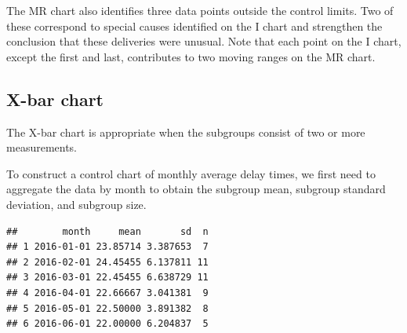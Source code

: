 \documentclass[
]{book}
\newenvironment{Shaded}{\begin{snugshade}}{\end{snugshade}}
\newcommand{\AttributeTok}[1]{\textcolor[rgb]{0.13,0.29,0.53}{#1}}
\newcommand{\CommentTok}[1]{\textcolor[rgb]{0.56,0.35,0.01}{\textit{#1}}}
\newcommand{\ConstantTok}[1]{\textcolor[rgb]{0.56,0.35,0.01}{#1}}
\newcommand{\ControlFlowTok}[1]{\textcolor[rgb]{0.13,0.29,0.53}{\textbf{#1}}}
\newcommand{\DecValTok}[1]{\textcolor[rgb]{0.00,0.00,0.81}{#1}}
\newcommand{\FunctionTok}[1]{\textcolor[rgb]{0.13,0.29,0.53}{\textbf{#1}}}
\newcommand{\NormalTok}[1]{#1}
\newcommand{\OtherTok}[1]{\textcolor[rgb]{0.56,0.35,0.01}{#1}}
\newcommand{\SpecialCharTok}[1]{\textcolor[rgb]{0.81,0.36,0.00}{\textbf{#1}}}
\begin{document}
The MR chart also identifies three data points outside the control limits. Two of these correspond to special causes identified on the I chart and strengthen the conclusion that these deliveries were unusual. Note that each point on the I chart, except the first and last, contributes to two moving ranges on the MR chart.

\subsection{X-bar chart}\label{x-bar-chart}

The X-bar chart is appropriate when the subgroups consist of two or more measurements.

To construct a control chart of monthly average delay times, we first need to aggregate the data by month to obtain the subgroup mean, subgroup standard deviation, and subgroup size.

\begin{Shaded}
\end{Shaded}

\begin{verbatim}
##        month     mean       sd  n
## 1 2016-01-01 23.85714 3.387653  7
## 2 2016-02-01 24.45455 6.137811 11
## 3 2016-03-01 22.45455 6.638729 11
## 4 2016-04-01 22.66667 3.041381  9
## 5 2016-05-01 22.50000 3.891382  8
## 6 2016-06-01 22.00000 6.204837  5
\end{verbatim}
\end{document}
